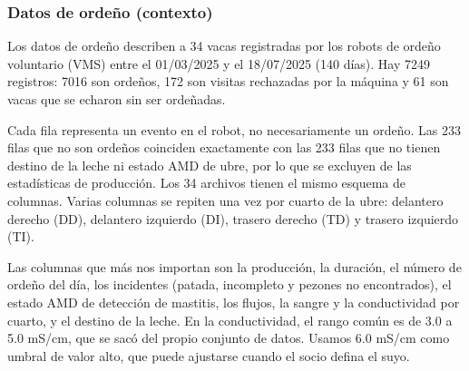 \subsubsection*{Datos de ordeño (contexto)}

Los datos de ordeño describen a 34 vacas registradas por los robots de ordeño voluntario (VMS) entre el 01/03/2025 y el 18/07/2025 (140 días). Hay 7249 registros: 7016 son ordeños, 172 son visitas rechazadas por la máquina y 61 son vacas que se echaron sin ser ordeñadas.

Cada fila representa un evento en el robot, no necesariamente un ordeño. Las 233 filas que no son ordeños coinciden exactamente con las 233 filas que no tienen destino de la leche ni estado AMD de ubre, por lo que se excluyen de las estadísticas de producción. Los 34 archivos tienen el mismo esquema de columnas. Varias columnas se repiten una vez por cuarto de la ubre: delantero derecho (DD), delantero izquierdo (DI), trasero derecho (TD) y trasero izquierdo (TI).

Las columnas que más nos importan son la producción, la duración, el número de ordeño del día, los incidentes (patada, incompleto y pezones no encontrados), el estado AMD de detección de mastitis, los flujos, la sangre y la conductividad por cuarto, y el destino de la leche. En la conductividad, el rango común es de 3.0 a 5.0 mS/cm, que se sacó del propio conjunto de datos. Usamos 6.0 mS/cm como umbral de valor alto, que puede ajustarse cuando el socio defina el suyo.
